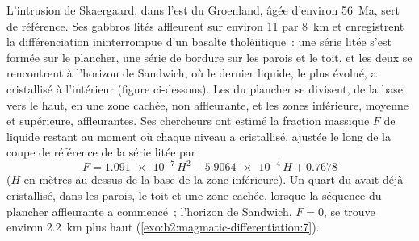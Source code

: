 L'intrusion de Skaergaard, dans l'est du Groenland, âgée d'environ \qty{56}{Ma}, sert de référence.
Ses gabbros lités affleurent sur environ 11 par \qty{8}{km} et enregistrent la différenciation ininterrompue
d'un basalte tholéiitique~: une série litée s'est formée sur le plancher, une série de bordure sur les
parois et le toit, et les deux se rencontrent à l'horizon de Sandwich,
où le dernier liquide, le plus évolué, a cristallisé à l'intérieur (figure ci-dessous).
Les  du plancher se divisent, de la base vers le haut, en une zone cachée, non affleurante,
et les zones inférieure, moyenne et supérieure, affleurantes. Ses
chercheurs ont estimé la fraction massique $F$ de liquide restant au moment où chaque niveau a cristallisé, ajustée
le long de la coupe de référence de la série litée par
\[
F = \num{1.091e-7}\,H^2 - \num{5.9064e-4}\,H + 0.7678
\]
($H$ en mètres au-dessus de la base de la zone inférieure). Un quart du  avait déjà
cristallisé, dans les parois, le toit et une zone cachée, lorsque la séquence du plancher
affleurante a commencé~; l'horizon de Sandwich, $F = 0$, se trouve environ \qty{2.2}{km} plus haut
(\cref{exo:b2:magmatic-differentiation:7}).

